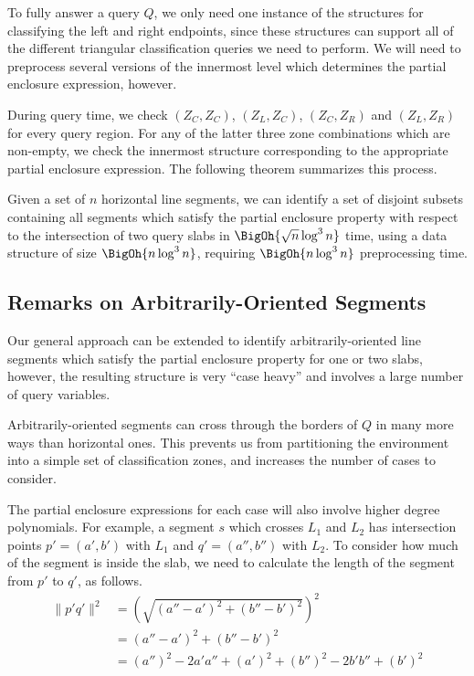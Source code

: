 To fully answer a query $Q$, we only need one instance of the structures for classifying the left and right endpoints, since these structures can support all of the different triangular classification queries we need to perform.
We will need to preprocess several versions of the innermost level which determines the partial enclosure expression, however.

During query time, we check $(Z_C, Z_C)$, $(Z_L, Z_C)$, $(Z_C, Z_R)$ and $(Z_L, Z_R)$ for every query region. 
For any of the latter three zone combinations which are non-empty, we check the innermost structure corresponding to the appropriate partial enclosure expression.
The following theorem summarizes this process.

\begin{theorem}
\label{th:slabs:two}
Given a set of $n$ horizontal line segments, we can identify a set of disjoint subsets containing all segments which satisfy the partial enclosure property with respect to the intersection of two query slabs in $\BigOh{\sqrt{n}\log^3{n}}$ time, using a data structure of size $\BigOh{n\log^3{n}}$, requiring $\BigOh{n\log^3{n}}$ preprocessing time.
\end{theorem}


\subsection{Remarks on Arbitrarily-Oriented Segments}
\label{:slabs:remarks}

Our general approach can be extended to identify arbitrarily-oriented line segments which satisfy the partial enclosure property for one or two slabs, however, the resulting structure is very ``case heavy'' and involves a large number of query variables.

Arbitrarily-oriented segments can cross through the borders of $Q$ in many more ways than horizontal ones.
This prevents us from partitioning the environment into a simple set of classification zones, and increases the number of cases to consider.

The partial enclosure expressions for each case will also involve higher degree polynomials.
For example, a segment $s$ which crosses $L_1$ and $L_2$ has intersection points $p' = (a', b')$ with $L_1$ and $q' = (a'', b'')$ with $L_2$.  
To consider how much of the segment is inside the slab, we need to calculate the length of the segment from $p'$ to $q'$, as follows.
\[
\begin{split}
\|p'q'\|^2 
&= \left( \sqrt{(a'' - a')^2 + (b'' - b')^2} \right)^2 \\
%
&= (a'' - a')^2 + (b'' - b')^2 \\
%
&= (a'')^2 - 2a'a'' + (a')^2 + (b'')^2 - 2b'b'' + (b')^2
\end{split}
\]

